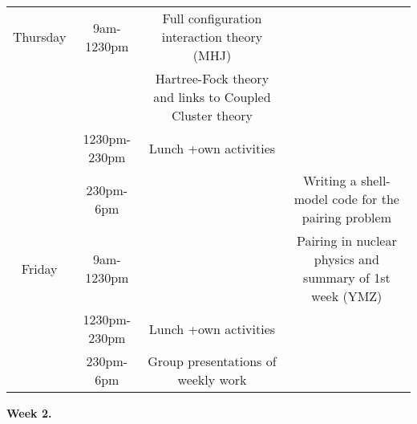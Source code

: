 \documentclass{beamer}
\begin{document}
\begin{frame}
\begin{block}{}
{\begin{tabular}{cccc}
\hline
Thursday  & 9am-1230pm    & Full configuration interaction theory (MHJ)                              &                                                                \\
          &               & Hartree-Fock theory and links to Coupled Cluster theory                  &                                                                \\
          & 1230pm-230pm  & Lunch +own activities                                                    &                                                                \\
          & 230pm-6pm     &                                                                          & Writing a shell-model code for the pairing problem             \\
\hline
Friday    & 9am-1230pm    &                                                                          & Pairing in nuclear physics and summary of 1st week (YMZ)       \\
          & 1230pm-230pm  & Lunch +own activities                                                    &                                                                \\
          & 230pm-6pm     & Group presentations of weekly work                                       &                                                                \\
\hline
\end{tabular}
}

\noindent


\noindent\textbf{Week 2.}


\end{block}
\end{frame}
\end{document}
